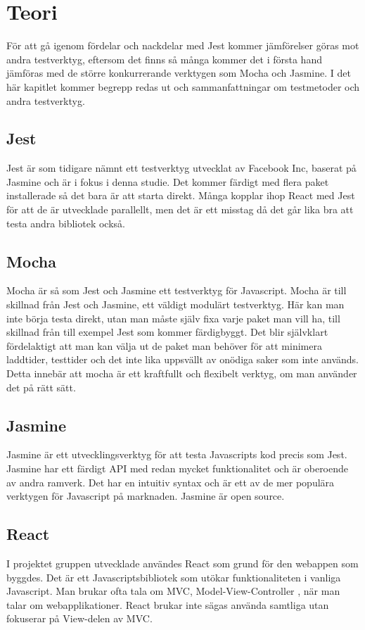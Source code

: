 \section{Teori}
\label{sec:david-theory}
För att gå igenom fördelar och nackdelar med Jest kommer jämförelser göras mot andra testverktyg, eftersom det finns så många kommer det i första hand jämföras med de större konkurrerande verktygen\cite{bib-test-tools} som Mocha och Jasmine. I det här kapitlet kommer begrepp redas ut och sammanfattningar om testmetoder och andra testverktyg.

\subsection{Jest}
Jest är som tidigare nämnt ett testverktyg utvecklat av Facebook Inc, baserat på Jasmine och är i fokus i denna studie. Det kommer färdigt med flera paket installerade så det bara är att starta direkt. Många kopplar ihop React med Jest för att de är utvecklade parallellt, men det är ett misstag då det går lika bra att testa andra bibliotek också.

\subsection{Mocha}
Mocha är så som Jest och Jasmine ett testverktyg för Javascript. Mocha är till skillnad från Jest och Jasmine, ett väldigt modulärt testverktyg. Här kan man inte börja testa direkt, utan man måste själv fixa varje paket man vill ha, till skillnad från till exempel Jest som kommer färdigbyggt. Det blir självklart fördelaktigt att man kan välja ut de paket man behöver för att minimera laddtider, testtider och det inte lika uppsvällt av onödiga saker som inte används. Detta innebär att mocha är ett kraftfullt och flexibelt verktyg, om man använder det på rätt sätt.

\subsection{Jasmine}
Jasmine är ett utvecklingsverktyg för att testa Javascripts kod precis som Jest. Jasmine har ett färdigt API med redan mycket funktionalitet och är oberoende av andra ramverk. Det har en intuitiv syntax och är ett av de mer populära verktygen för Javascript på marknaden. Jasmine är open source.

\subsection{React}
I projektet gruppen utvecklade användes React som grund för den webappen som byggdes. Det är ett Javascriptsbibliotek som utökar funktionaliteten i vanliga Javascript. Man brukar ofta tala om MVC, Model-View-Controller \cite{bib-mvc}, när man talar om webapplikationer. React brukar inte sägas använda samtliga utan fokuserar på View-delen av MVC.

